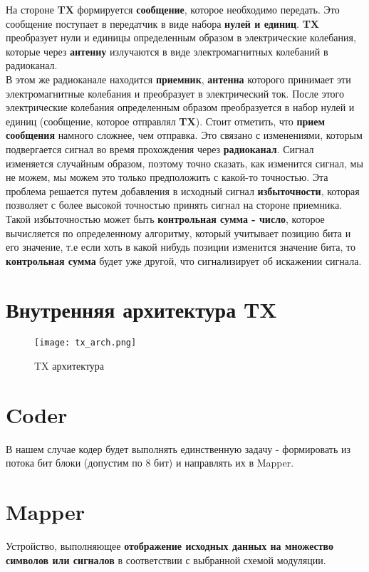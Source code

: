 На стороне \textbf{TX} формируется \textbf{сообщение}, которое необходимо передать. Это сообщение поступает в передатчик в виде набора \textbf{нулей и единиц}. \textbf{TX} преобразует нули и единицы определенным образом в электрические колебания, которые через \textbf{антенну} излучаются в виде электромагнитных колебаний в радиоканал.\\
В этом же радиоканале находится \textbf{приемник}, \textbf{антенна} которого принимает эти электромагнитные колебания и преобразует в электрический ток. После этого электрические колебания определенным образом преобразуется в набор нулей и единиц (сообщение, которое отправлял \textbf{TX}). Стоит отметить, что \textbf{прием сообщения} намного сложнее, чем отправка. Это связано с изменениями, которым подвергается сигнал во время прохождения через \textbf{радиоканал}. Сигнал изменяется случайным образом, поэтому точно сказать, как изменится сигнал, мы не можем, мы можем это только предположить с какой-то точностью. Эта проблема решается путем добавления в исходный сигнал \textbf{избыточности}, которая позволяет с более высокой точностью принять сигнал на стороне приемника. Такой избыточностью может быть \textbf{контрольная сумма - число}, которое вычисляется по определенному алгоритму, который учитывает позицию бита и его значение, т.е если хоть в какой нибудь позиции изменится значение бита, то \textbf{контрольная сумма} будет уже другой, что сигнализирует об искажении сигнала.

\section*{Внутренняя архитектура TX}

\begin{figure}[H]
    \centering
    \texttt{[image: tx\_arch.png]}
    \caption{TX архитектура}
\end{figure}

\section*{Coder}
В нашем случае кодер будет выполнять единственную задачу - формировать из потока бит блоки (допустим по 8 бит) и
направлять их в Mapper.

\section*{Mapper}

Устройство, выполняющее \textbf{отображение исходных данных на множество символов или сигналов} в соответствии с выбранной схемой модуляции. 

